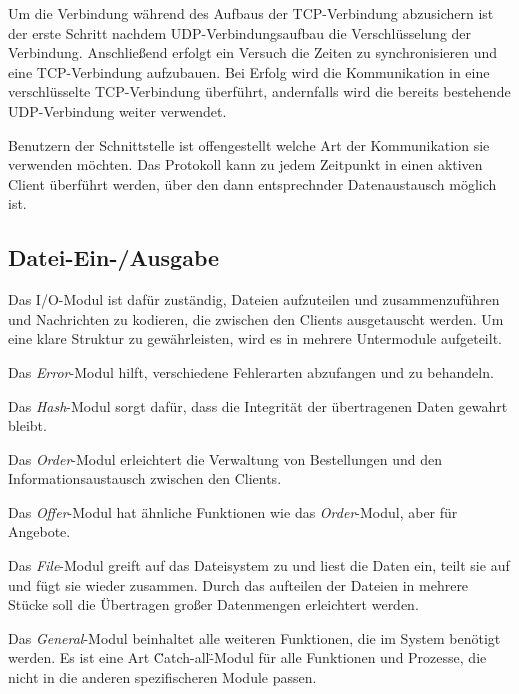 Um die Verbindung während des Aufbaus der TCP-Verbindung abzusichern ist der erste Schritt nachdem UDP-Verbindungsaufbau die Verschlüsselung der Verbindung. Anschließend erfolgt ein Versuch die Zeiten zu synchronisieren und eine TCP-Verbindung aufzubauen. Bei Erfolg wird die Kommunikation in eine verschlüsselte TCP-Verbindung überführt, andernfalls wird die bereits bestehende UDP-Verbindung weiter verwendet.

Benutzern der Schnittstelle ist offengestellt welche Art der Kommunikation sie verwenden möchten. Das Protokoll kann zu jedem Zeitpunkt in einen aktiven Client überführt werden, über den dann entsprechnder Datenaustausch möglich ist.

\subsection{Datei-Ein-/Ausgabe}
Das I/O-Modul ist dafür zuständig, Dateien aufzuteilen und zusammenzuführen und Nachrichten zu kodieren, die zwischen den Clients ausgetauscht werden. Um eine klare Struktur zu gewährleisten, wird es in mehrere Untermodule aufgeteilt.

Das \textit{Error}-Modul hilft, verschiedene Fehlerarten abzufangen und zu behandeln.

Das \textit{Hash}-Modul sorgt dafür, dass die Integrität der übertragenen Daten gewahrt bleibt.

Das \textit{Order}-Modul erleichtert die Verwaltung von Bestellungen und den Informationsaustausch zwischen den Clients.

Das \textit{Offer}-Modul hat ähnliche Funktionen wie das \textit{Order}-Modul, aber für Angebote.

Das \textit{File}-Modul greift auf das Dateisystem zu und liest die Daten ein, teilt sie auf und fügt sie wieder zusammen. Durch das aufteilen der Dateien in mehrere Stücke soll die Übertragen großer Datenmengen erleichtert werden.

Das \textit{General}-Modul beinhaltet alle weiteren Funktionen, die im System benötigt werden. Es ist eine Art \"Catch-all\"-Modul für alle Funktionen und Prozesse, die nicht in die anderen spezifischeren Module passen.
